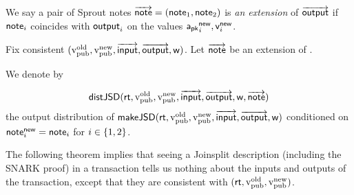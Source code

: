 \documentclass[11pt]{article}
\numberwithin{equation}{section} %
\numberwithin{figure}{section} %
\begin{document}
We say a pair of Sprout notes $\notes = (\note_1,\note_2)$ is \emph{an extension} of $\outputs$
if $\note_i$ coincides with $\output_i$ on the values $\new{\apk},\new{\val}$.

Fix consistent $(\vold,\vnew,\inputs,\outputs,\wit)$.
Let $\notes$ be an extension of \outputs.

We denote by 

\[\distjsd(\rt,\vold,\vnew,\inputs,\outputs,\wit,\notes)\]
the output distribution of
$\makejsd(\rt,\vold,\vnew,\inputs,\outputs,\wit)$
conditioned on $\new{\note}=\note_i$ for $i\in\two$.

The following theorem implies that seeing a Joinsplit description (including the SNARK proof) in a transaction 
tells us nothing about the inputs and outputs of the transaction, except that they are consistent with $(\rt,\vold,\vnew)$.
\end{document}

